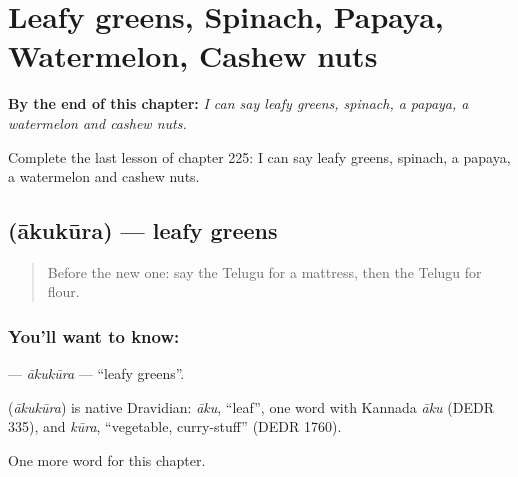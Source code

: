 
\chapter{Leafy greens, Spinach, Papaya, Watermelon, Cashew nuts}
\label{ch:te-leafy-greens-spinach-papaya-watermelon-cashew-nuts}

\begin{chapteropening}
\textbf{By the end of this chapter:} \emph{I can say leafy greens, spinach, a papaya, a watermelon and cashew nuts.}

Complete the last lesson of chapter 225: I can say leafy greens, spinach, a papaya, a watermelon and cashew nuts.
\end{chapteropening}

\section[\texorpdfstring{\te{ఆకుకూర} (ākukūra)}{ఆకుకూర (ākukūra)}]{ (ākukūra) — leafy greens}

\label{lesson:TE-C225-akukura}



\begin{quote}
Before the new one: say the Telugu for a mattress, then the Telugu for flour.
\end{quote}

\subsection*{You'll want to know: }
\textbf{} — \emph{ākukūra} — \textquotedblleft{}leafy greens\textquotedblright{}.

\begin{cousinweb}
\textbf{} (\emph{ākukūra}) is native Dravidian: \emph{āku}, \textquotedblleft{}leaf\textquotedblright{}, one word with Kannada \emph{āku} (DEDR 335), and \emph{kūra}, \textquotedblleft{}vegetable, curry-stuff\textquotedblright{} (DEDR 1760).
\end{cousinweb}

\begin{grammarlens}[title={What you've built}]
One more word for this chapter.
\end{grammarlens}

